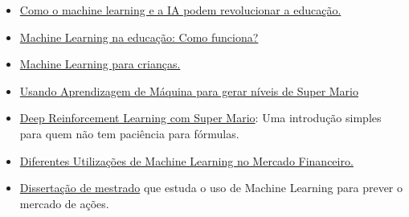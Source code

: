 \documentclass[12pt]{article}
\begin{document}
            \begin{itemize}
            
                \item
                \href{https://itforum.com.br/colunas/como-o-machine-learning-e-a-ia-podem-revolucionar-a-educacao/}{Como o machine learning e a IA podem revolucionar a educação.}

            
                \item
                \href{https://cer.sebrae.com.br/machine-learning-na-educacao-como-funciona/}{Machine Learning na educação: Como funciona?}

            
             \item
             \href{https://machinelearningforkids.co.uk/?lang=pt-br#!/about}{Machine Learning para crianças.
}
            
             \item   
             \href{https://medium.com/machina-sapiens/aprendizagem-de-m\%C3\%A1quina-\%C3\%A9-divertido-parte-2-7c00d034e1d5}{ Usando Aprendizagem de Máquina para gerar níveis de Super Mario}
            
             \item
             \href{https://paulovasconcellos.com.br/explicando-deep-reinforcement-learning-com-super-mario-ao-inv\%C3\%A9s-de-matem\%C3\%A1tica-4c77392cc733}{Deep Reinforcement Learning com Super Mario}: Uma introdução simples para quem não tem paciência para fórmulas.
             
             \item  
             \href{https://minerandodados.com.br/diferentes-utilizacoes-de-machine-learning-no-mercado-financeiro/}{Diferentes Utilizações de Machine Learning no Mercado Financeiro.}
             
             \item 
             \href{http://bibliotecadigital.fgv.br/dspace/bitstream/handle/10438/27999/carolina_calio_nogueira_VF.pdf?sequence=1&isAllowed=y}{Dissertação de mestrado} que estuda o uso de Machine Learning para prever o mercado de ações.
             
            \end{itemize}

        
          

        
\end{document}
